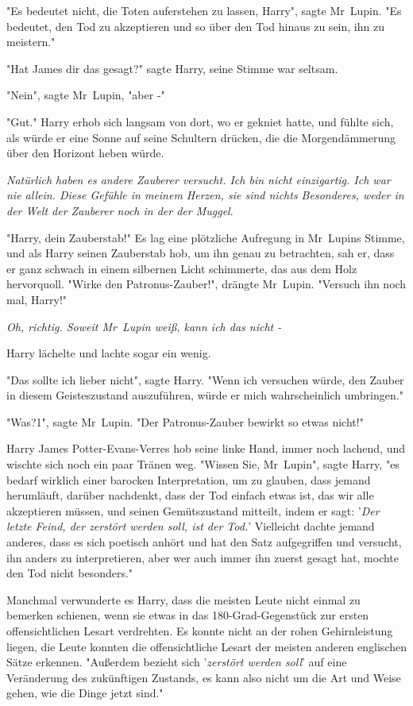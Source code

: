{"Es bedeutet nicht, die Toten auferstehen zu lassen, Harry", sagte Mr~Lupin. "Es bedeutet, den Tod zu akzeptieren und so über den Tod hinaus zu sein, ihn zu meistern."

"Hat James dir das gesagt?" sagte Harry, seine Stimme war seltsam.

"Nein", sagte Mr~Lupin, "aber -"

"Gut." Harry erhob sich langsam von dort, wo er gekniet hatte, und fühlte sich, als würde er eine Sonne auf seine Schultern drücken, die die Morgendämmerung über den Horizont heben würde.

\emph{Natürlich haben es andere Zauberer versucht. Ich bin nicht einzigartig. Ich war nie allein. Diese Gefühle in meinem Herzen, sie sind nichts Besonderes, weder in der Welt der Zauberer noch in der der Muggel}.

"Harry, dein Zauberstab!" Es lag eine plötzliche Aufregung in Mr~Lupins Stimme, und als Harry seinen Zauberstab hob, um ihn genau zu betrachten, sah er, dass er ganz schwach in einem silbernen Licht schimmerte, das aus dem Holz hervorquoll. "Wirke den Patronus-Zauber!", drängte Mr~Lupin. "Versuch ihn noch mal, Harry!"

\emph{Oh, richtig. Soweit Mr~Lupin weiß, kann ich das nicht -}

Harry lächelte und lachte sogar ein wenig.

"Das sollte ich lieber nicht", sagte Harry. "Wenn ich versuchen würde, den Zauber in diesem Geisteszustand auszuführen, würde er mich wahrscheinlich umbringen."

"Was?1", sagte Mr~Lupin. "Der Patronus-Zauber bewirkt so etwas nicht!"

Harry James Potter-Evans-Verres hob seine linke Hand, immer noch lachend, und wischte sich noch ein paar Tränen weg. "Wissen Sie, Mr~Lupin", sagte Harry, "es bedarf wirklich einer barocken Interpretation, um zu glauben, dass jemand herumläuft, darüber nachdenkt, dass der Tod einfach etwas ist, das wir alle akzeptieren müssen, und seinen Gemütszustand mitteilt, indem er sagt: '\emph{Der letzte Feind, der zerstört werden soll, ist der Tod.}' Vielleicht dachte jemand anderes, dass es sich poetisch anhört und hat den Satz aufgegriffen und versucht, ihn anders zu interpretieren, aber wer auch immer ihn zuerst gesagt hat, mochte den Tod nicht besonders."

Manchmal verwunderte es Harry, dass die meisten Leute nicht einmal zu bemerken schienen, wenn sie etwas in das 180-Grad-Gegenstück zur ersten offensichtlichen Lesart verdrehten. Es konnte nicht an der rohen Gehirnleistung liegen, die Leute konnten die offensichtliche Lesart der meisten anderen englischen Sätze erkennen. "Außerdem bezieht sich '\emph{zerstört werden soll}' auf eine Veränderung des zukünftigen Zustands, es kann also nicht um die Art und Weise gehen, wie die Dinge jetzt sind."

}
